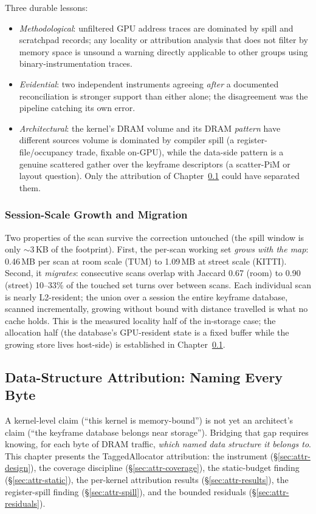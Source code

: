 Three durable lessons:
\begin{itemize}
  \item \emph{Methodological}: unfiltered GPU address traces are dominated by spill and scratchpad records; any locality or attribution analysis that does not filter by memory space is unsound a warning directly applicable to other groups using binary-instrumentation traces.
  \item \emph{Evidential}: two independent instruments agreeing \emph{after} a documented reconciliation is stronger support than either alone; the disagreement was the pipeline catching its own error.
  \item \emph{Architectural}: the kernel's DRAM volume and its DRAM \emph{pattern} have different sources volume is dominated by compiler spill (a register-file/occupancy trade, fixable on-GPU), while the data-side pattern is a genuine scattered gather over the keyframe descriptors (a scatter-PiM or layout question). Only the attribution of Chapter~\ref{ch:attribution} could have separated them.
\end{itemize}

\subsubsection{Session-Scale Growth and Migration}
\label{sec:loc-growth}

Two properties of the scan survive the correction untouched (the spill window is only $\sim$3\,KB of the footprint). First, the per-scan working set \emph{grows with the map}: 0.46\,MB per scan at room scale (TUM) to 1.09\,MB at street scale (KITTI). Second, it \emph{migrates}: consecutive scans overlap with Jaccard 0.67 (room) to 0.90 (street) 10--33\% of the touched set turns over between scans. Each individual scan is nearly L2-resident; the union over a session the entire keyframe database, scanned incrementally, growing without bound with distance travelled is what no cache holds. This is the measured locality half of the in-storage case; the allocation half (the database's GPU-resident state is a fixed buffer while the growing store lives host-side) is established in Chapter~\ref{ch:attribution}.

\subsection{Data-Structure Attribution: Naming Every Byte}
\label{ch:attribution}

A kernel-level claim (“this kernel is memory-bound”) is not yet an architect’s claim (“the keyframe database belongs near storage”). Bridging that gap requires knowing, for each byte of DRAM traffic, \emph{which named data structure it belongs to}. This chapter presents the TaggedAllocator attribution: the instrument (\S\ref{sec:attr-design}), the coverage discipline (\S\ref{sec:attr-coverage}), the static-budget finding (\S\ref{sec:attr-static}), the per-kernel attribution results (\S\ref{sec:attr-results}), the register-spill finding (\S\ref{sec:attr-spill}), and the bounded residuals (\S\ref{sec:attr-residuals}).

